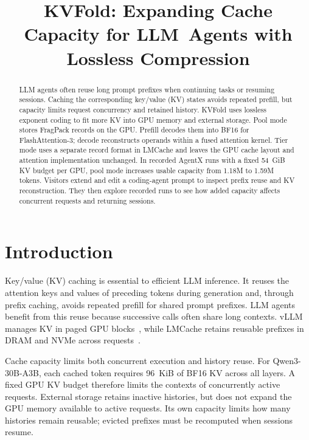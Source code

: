 \documentclass[conference]{IEEEtran}
\title{KVFold: Expanding Cache Capacity for \mbox{LLM Agents} with Lossless Compression}
\author{\IEEEauthorblockN{Working draft}
\IEEEauthorblockA{Author information to be supplied}}
\begin{document}
\maketitle

\begin{abstract}
LLM agents often reuse long prompt prefixes when continuing tasks or
resuming sessions. Caching the corresponding key/value (KV) states avoids
repeated prefill, but capacity limits request concurrency and retained
history. KVFold uses lossless
exponent coding to fit more KV into GPU memory and external storage.
Pool mode stores FragPack records on the GPU. Prefill decodes them into
BF16 for FlashAttention-3; decode reconstructs operands within a fused
attention kernel. Tier mode uses a separate record
format in LMCache and leaves the GPU cache layout and attention
implementation unchanged. In recorded AgentX runs with a fixed 54~GiB KV
budget per GPU, pool mode increases usable capacity from 1.18M to 1.59M
tokens. Visitors extend and edit a coding-agent prompt to inspect prefix
reuse and KV reconstruction. They then explore recorded runs to see how
added capacity affects concurrent requests and returning sessions.
\end{abstract}

\section{Introduction}
Key/value (KV) caching is essential to efficient LLM inference. It reuses
the attention keys and values of preceding tokens during generation and,
through prefix caching, avoids repeated prefill for shared prompt prefixes.
LLM agents benefit from this reuse because successive calls often share
long contexts. vLLM manages KV in paged GPU blocks~\cite{vllm}, while LMCache retains
reusable prefixes in DRAM and NVMe across requests~\cite{lmcache}.

Cache capacity limits both concurrent execution and history reuse.
For Qwen3-30B-A3B, each cached token requires 96~KiB of BF16 KV across all
layers. A fixed GPU KV budget therefore limits the contexts of concurrently
active requests. External storage retains inactive histories, but does not
expand the GPU memory available to active requests. Its own capacity limits
how many histories remain reusable; evicted prefixes must be recomputed
when sessions resume.
\end{document}
